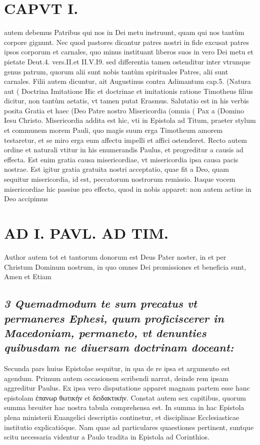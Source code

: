 \documentclass{article}
\begin{document}
\begin{pages}
\section*{CAPVT I. }
\marginpar{[ p.5 ]}\pstart autem debemus Patribus qui nos in Dei metu instruunt, quam qui nos tantùm corpore gignunt. Nec quod pastores dicantur patres nostri in fide excusat patres ipsos corporum et carnales, quo minus instituant liberos suos in vero Dei metu et pietate Deut.4. vers.II.et II.V.I9. sed differentia tamen ostenditur inter vtrunque genus patrum, quorum alii sunt nobis tantùm spirituales Patres, alii sunt carnales.  \pend\pstart Filii autem dicuntur, ait Augustinus contra Adimantum cap.5. (Natura aut ( Doctrina Imitatione Hic et doctrinae et imitationis ratione Timotheus filius dicitur, non tantùm aetatis, vt tamen putat Erasmus. Salutatio est in his verbis posita Gratia et haec (Deo Patre nostro Misericordia (omnia ( Pax a (Domino Iesu Christo. Misericordia addita est hic, vti in Epistola ad Titum, praeter stylum et communem morem Pauli, quo magis suum erga Timotheum amorem testaretur, et se miro erga eum affectu impelli et affici ostenderet. Recto autem ordine et naturali vtitur in his enumerandis Paulus, et progreditur a causis ad effecta. Est enim gratia causa misericordiae, vt misericordia ipsa causa pacis nostrae. Est igitur gratia gratuita nostri acceptatio, quae fit a Deo, quam sequitur misericordia, id est, peccatorum nostrorum remissio. Itaque vocem misericordiae hic passiue pro effecto, quod in nobis apparet: non autem actiue in Deo accipimus  \pend
\section*{AD I. PAVL. AD TIM. }
\marginpar{[ p.6 ]}\pstart Author autem tot et tantorum donorum est Deus Pater noster, in et per Christum Dominum nostrum, in quo omnes Dei promissiones et beneficia sunt, Amen et Etiam  \pend
{}
{}
\subsection*{\textit{3 Quemadmodum te sum precatus vt permaneres Ephesi, quum proficiscerer in Macedoniam, permaneto, vt denunties quibusdam ne diuersam doctrinam doceant: }}\pstart Secunda pars huius Epistolae sequitur, in qua de re ipsa et argumento est agendum. Primum autem occasionem scribendi narrat, deinde rem ipsam aggreditur Paulus. Ex ipsa vero disputatione apparet magnam partem esse hanc epistolam ἐπανωρ θωτικήν et δειδακτικήν. Constat autem sex capitibus, quorum summa breuiter hac nostra tabula comprehensa est. In summa in hac Epistola plena ministerii Euangelici descriptio continetur, et disciplinae Ecclesiasticae institutio explicatióque. Nam quae ad particulares quaestiones pertinent, suntque  scitu necessaria videntur a Paulo tradita in Epistola ad Corinthios.  \pend

\end{pages}
\end{document}
